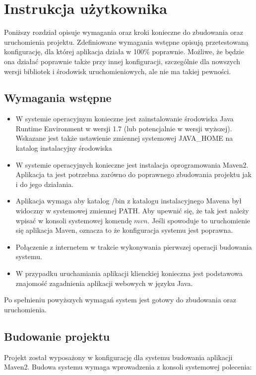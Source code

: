 ﻿\chapter{Instrukcja użytkownika}

Poniższy rozdział opisuje wymagania oraz kroki konieczne do zbudowania oraz uruchomienia projektu.
Zdefiniowane wymagania wstępne opisują przetestowaną konfigurację, dla której aplikacja działa w 100\% poprawnie.
Możliwe, że będzie ona działać poprawnie także przy innej konfiguracji, szczególnie dla nowszych wersji bibliotek i środowisk uruchomieniowych, ale nie ma takiej pewności.

\section{Wymagania wstępne}

\begin{itemize}
	\item W systemie operacyjnym konieczne jest zainstalowanie środowiska Java Runtime Environment w wersji 1.7 (lub potencjalnie w wersji wyższej). 
	Wskazane jest także ustawienie zmiennej systemowej JAVA\_HOME na katalog instalacyjny środowiska
	\item W systemie operacyjnych konieczne jest instalacja oprogramowania Maven2.
	Aplikacja ta jest potrzebna zarówno do poprawnego zbudowania projektu jak i do jego działania.
	\item Aplikacja wymaga aby katalog /bin z katalogu instalacyjnego Mavena był widoczny w systemowej zmiennej PATH.
	Aby upewnić się, że tak jest należy wpisać w konsoli systemowej komendę $mvn$. 
	Jeśli spowoduje to uruchomienie się aplikacja Maven, oznacza to że konfiguracja systemu jest poprawna.
	\item Połączenie z internetem w trakcie wykonywania pierwszej operacji budowania systemu.
	\item W przypadku uruchamiania aplikacji klienckiej konieczna jest podstawowa znajomość zagadnienia aplikacji webowych w języku Java.
 \end{itemize}
 
 Po spełnieniu powyższych wymagań system jest gotowy do zbudowania oraz uruchomienia.

\section{Budowanie projektu}

Projekt został wyposażony w konfigurację dla systemu budowania aplikacji Maven2.
Budowa systemu wymaga wprowadzenia z konsoli systemowej polecenia:

